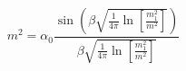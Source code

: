 \begin{equation}
m^2 = \alpha_0 \frac {\sin \left( \beta \sqrt{ \frac{1}{4 \pi}
\ln[\frac{m_1^2}{m^2}]} \right)}{\beta \sqrt{
\frac{1}{4
\pi}
\ln[\frac{m_1^2}{m^2}]}}
\end{equation}


